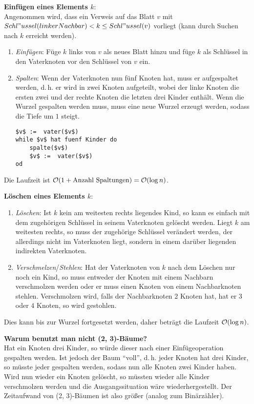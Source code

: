 \textbf{Einfügen eines Elements $k$}: \\
Angenommen wird, dass ein Verweis auf das Blatt $v$ mit
$Schl"ussel(linkerNachbar) < k \le Schl"ussel(v)$ vorliegt
(kann durch Suchen nach $k$ erreicht werden).
\begin{enumerate}
    \item
    \emph{Einfügen}:
    Füge $k$ links von $v$ als neues Blatt hinzu und füge $k$ als Schlüssel
    in den Vaterknoten vor den Schlüssel von $v$ ein.

    \item
    \emph{Spalten}:
    Wenn der Vaterknoten nun fünf Knoten hat, muss er aufgespaltet werden,
    d.\,h. er wird in zwei Knoten aufgeteilt, wobei der linke
    Knoten die ersten zwei und der rechte Knoten die letzten drei
    Kinder enthält.
    Wenn die Wurzel gespalten werden muss, muss eine neue Wurzel erzeugt
    werden, sodass die Tiefe um $1$ steigt.
    \begin{lstlisting}
$v$ :=  vater($v$)
while $v$ hat fuenf Kinder do
    spalte($v$)
    $v$ :=  vater($v$)
od
    \end{lstlisting}
\end{enumerate}
Die Laufzeit ist $\mathcal{O}(1 + \text{Anzahl Spaltungen}) = \mathcal{O}(\log n)$.

\linie

\textbf{Löschen eines Elements $k$}:
\begin{enumerate}
    \item
    \emph{Löschen}:
    Ist $k$ kein am weitesten rechts liegendes Kind, so kann es einfach
    mit dem zugehörigen Schlüssel in seinem Vaterknoten gelöscht werden.
    Liegt $k$ am weitesten rechts, so muss der zugehörige Schlüssel
    verändert werden, der allerdings nicht im Vaterknoten liegt, sondern
    in einem darüber liegenden indirekten Vaterknoten.

    \item
    \emph{Verschmelzen}/\emph{Stehlen}:
    Hat der Vaterknoten von $k$ nach dem Löschen nur noch ein Kind, so
    muss entweder der Knoten mit einem Nachbarn verschmolzen werden oder
    er muss einen Knoten von einem Nachbarknoten stehlen.
    Verschmolzen wird, falls der Nachbarknoten $2$ Knoten hat, hat er
    $3$ oder $4$ Knoten, so wird gestohlen.
\end{enumerate}
Dies kann bis zur Wurzel fortgesetzt werden, daher beträgt die Laufzeit
$\mathcal{O}(\log n)$.

\linie

\textbf{Warum benutzt man nicht (2, 3)-Bäume?} \\
Hat ein Knoten drei Kinder, so würde dieser nach einer Einfügeoperation
gespalten werden.
Ist jedoch der Baum "`voll"', d.\,h. jeder Knoten hat drei Kinder,
so müsste jeder gespalten werden, sodass nun alle Knoten zwei Kinder haben.
Wird nun wieder ein Knoten gelöscht, so müssten wieder alle Kinder verschmolzen
werden und die Ausgangssituation wäre wiederhergestellt.
Der Zeitaufwand von (2, 3)-Bäumen ist also größer
(analog zum Binärzähler).

